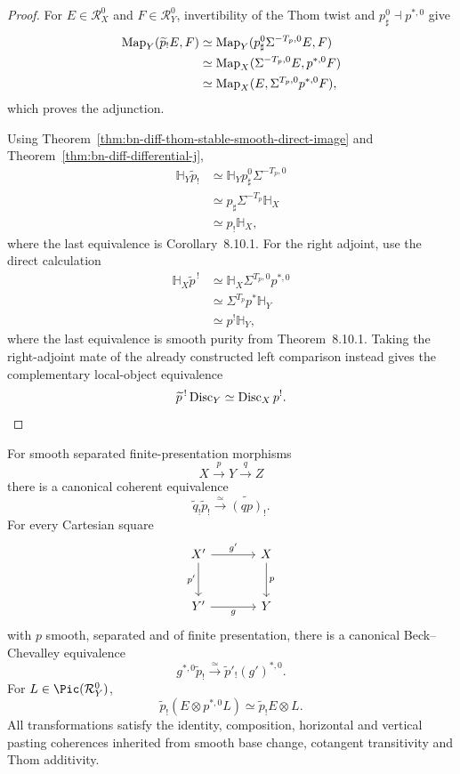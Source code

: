\begin{proof}
For \(E\in\mathcal R_X^0\) and \(F\in\mathcal R_Y^0\), invertibility of the
Thom twist and \(p_\sharp^0\dashv p^{*,0}\) give
\[
\begin{aligned}
\operatorname{Map}_Y(\widetilde p_!E,F)
&\simeq
\operatorname{Map}_Y(p_\sharp^0\Sigma^{-T_p,0}E,F)\\
&\simeq
\operatorname{Map}_X(\Sigma^{-T_p,0}E,p^{*,0}F)\\
&\simeq
\operatorname{Map}_X(E,\Sigma^{T_p,0}p^{*,0}F),
\end{aligned}
\]
which proves the adjunction.

Using Theorem~\ref{thm:bn-diff-thom-stable-smooth-direct-image} and
Theorem~\ref{thm:bn-diff-differential-j},
\[
\begin{aligned}
\mathbb H_Y\widetilde p_!
&\simeq
\mathbb H_Yp_\sharp^0\Sigma^{-T_p,0}\\
&\simeq
p_\sharp\Sigma^{-T_p}\mathbb H_X\\
&\simeq
p_!\mathbb H_X,
\end{aligned}
\]
where the last equivalence is Corollary~8.10.1.  For the right adjoint, use the
direct calculation
\[
\begin{aligned}
\mathbb H_X\widetilde p^{\,!}
&\simeq
\mathbb H_X\Sigma^{T_p,0}p^{*,0}\\
&\simeq
\Sigma^{T_p}p^*\mathbb H_Y\\
&\simeq
p^!\mathbb H_Y,
\end{aligned}
\]
where the last equivalence is smooth purity from Theorem~8.10.1.  Taking the
right-adjoint mate of the already constructed left comparison instead gives
the complementary local-object equivalence
\[
  \widetilde p^{\,!}\operatorname{Disc}_Y
  \simeq
  \operatorname{Disc}_Xp^!.
\]
\end{proof}

\begin{theorem}
\label{thm:bn-diff-smooth-thom-stable-coherence}
For smooth separated finite-presentation morphisms
\[
  X\xrightarrow{p}Y\xrightarrow{q}Z
\]
there is a canonical coherent equivalence
\[
  \boxed{
  \widetilde q_!\widetilde p_!
  \xrightarrow{\simeq}
  \widetilde{(qp)}_!.
  }
\]
For every Cartesian square
\[
\begin{tikzcd}[column sep=large,row sep=large]
X' \ar[r,"g'"] \ar[d,"p'"'] & X \ar[d,"p"]\\
Y' \ar[r,"g"'] & Y
\end{tikzcd}
\]
with \(p\) smooth, separated and of finite presentation, there is a canonical
Beck--Chevalley equivalence
\[
  \boxed{
  g^{*,0}\widetilde p_!
  \xrightarrow{\simeq}
  \widetilde p'_!(g')^{*,0}.
  }
\]
For \(L\in\Pic(\mathcal R_Y^0)\),
\[
  \widetilde p_!(E\otimes p^{*,0}L)
  \simeq
  \widetilde p_!E\otimes L.
\]
All transformations satisfy the identity, composition, horizontal and vertical
pasting coherences inherited from smooth base change, cotangent transitivity and
Thom additivity.
\end{theorem}

